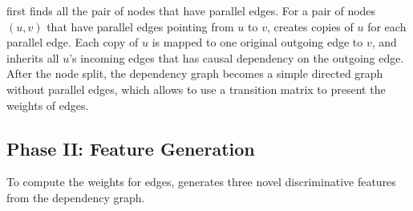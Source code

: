 \tool first finds all the pair of nodes that have parallel edges.
For a pair of nodes $(u,v)$ that have parallel edges pointing from $u$ to $v$,
\tool creates copies of $u$ for each parallel edge.
Each copy of $u$ is mapped to one original outgoing edge to $v$, 
and inherits all $u$'s incoming edges that has causal dependency on the outgoing edge.
After the node split, the dependency graph becomes a simple directed graph without parallel edges, which allows \tool to use a transition matrix to present the weights of edges.


\subsection{Phase II: Feature Generation}
\label{subsec:feature-generation}
To compute the weights for edges, \tool generates three novel discriminative features from the dependency graph.

